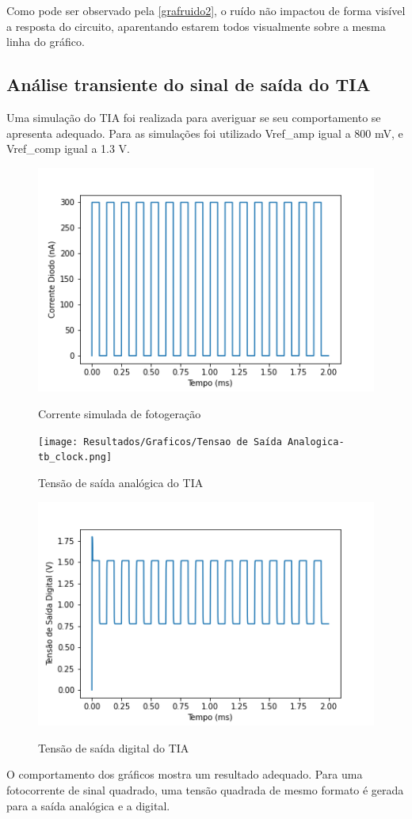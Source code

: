 Como pode ser observado pela \autoref{grafruido2}, o ruído não impactou de forma visível a resposta do circuito, aparentando estarem todos visualmente sobre a mesma linha do gráfico.

\subsection{Análise transiente do sinal de saída do TIA}
\label{DCAPS}

Uma simulação do TIA foi realizada para averiguar se seu comportamento se apresenta adequado. Para as simulações foi utilizado Vref\_amp igual a 800 mV, e Vref\_comp igual a 1.3 V.

\begin{figure}[htb]
 \centering
    \caption{Corrente simulada de fotogeração} 
    \includegraphics[scale=0.5]{Resultados/Graficos/Corrente Diodo-tb_clock.png}
    \label{graf_tiasinal}
\end{figure}

\begin{figure}[htb]
 \centering
    \caption{Tensão de saída analógica do TIA} 
    \texttt{[image: Resultados/Graficos/Tensao de Saída Analogica-tb\_clock.png]}
    \label{graf_tiasinal2}
\end{figure}

\begin{figure}[htb]
 \centering
    \caption{Tensão de saída digital do TIA} 
    \includegraphics[scale=0.5]{Resultados/Graficos/Tensao de Saida Digital-tb_clock.png}
    \label{graf_tiasinal3}
\end{figure}

O comportamento dos gráficos mostra um resultado adequado. Para uma fotocorrente de sinal quadrado, uma tensão quadrada de mesmo formato é gerada para a saída analógica e a digital.

